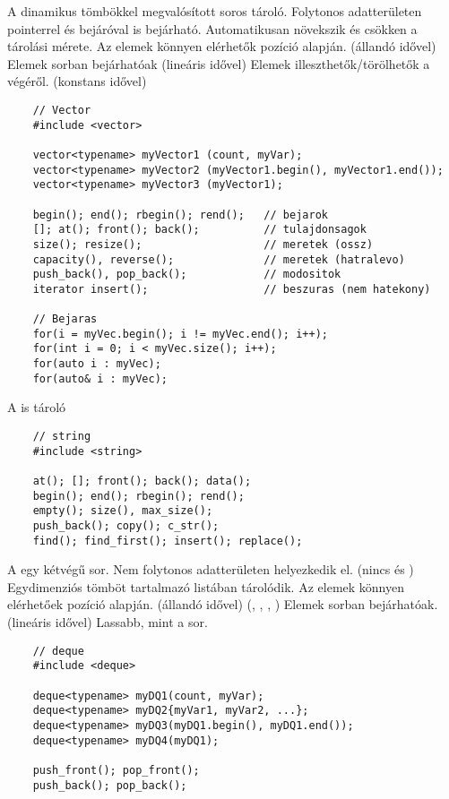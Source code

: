 \documentclass[main.tex]{subfiles}
\begin{document}
  A  dinamikus tömbökkel megvalósított soros tároló.
  Folytonos adatterületen pointerrel és bejáróval is bejárható.
  Automatikusan növekszik és csökken a tárolási mérete.
  Az elemek könnyen elérhetők pozíció alapján. (állandó idővel)
  Elemek sorban bejárhatóak (lineáris idővel)
  Elemek illeszthetők/törölhetők a végéről. (konstans idővel)
  \begin{lstlisting}
    // Vector
    #include <vector>

    vector<typename> myVector1 (count, myVar);
    vector<typename> myVector2 (myVector1.begin(), myVector1.end());
    vector<typename> myVector3 (myVector1);

    begin(); end(); rbegin(); rend();   // bejarok
    []; at(); front(); back();          // tulajdonsagok
    size(); resize();                   // meretek (ossz)
    capacity(), reverse();              // meretek (hatralevo)
    push_back(), pop_back();            // modositok
    iterator insert();                  // beszuras (nem hatekony)

    // Bejaras
    for(i = myVec.begin(); i != myVec.end(); i++);
    for(int i = 0; i < myVec.size(); i++);
    for(auto i : myVec);
    for(auto& i : myVec);
  \end{lstlisting}

  A  is  tároló
  \begin{lstlisting}
    // string
    #include <string>

    at(); []; front(); back(); data();
    begin(); end(); rbegin(); rend();
    empty(); size(), max_size();
    push_back(); copy(); c_str();
    find(); find_first(); insert(); replace();
  \end{lstlisting}

  A  egy kétvégű sor. 
  Nem folytonos adatterületen helyezkedik el.
  (nincs  és )
  Egydimenziós tömböt tartalmazó listában tárolódik.
  Az elemek könnyen elérhetőek pozíció alapján. (állandó idővel)
  (\kkod{[]}, , , )
  Elemek sorban bejárhatóak. (lineáris idővel)
  Lassabb, mint a sor.
  
  \vspace{1em}
  \begin{lstlisting}
    // deque
    #include <deque>

    deque<typename> myDQ1(count, myVar);
    deque<typename> myDQ2{myVar1, myVar2, ...};
    deque<typename> myDQ3(myDQ1.begin(), myDQ1.end());
    deque<typename> myDQ4(myDQ1);
    
    push_front(); pop_front();
    push_back(); pop_back();
  \end{lstlisting}
  
\end{document}
